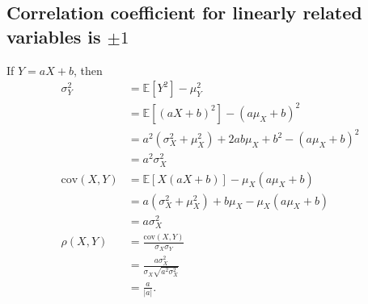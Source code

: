 \documentclass{article}
\begin{document}
\subsection{Correlation coefficient for linearly related variables is $\pm1$}
If $Y=aX+b$, then
\begin{align*}
\sigma_Y^2 &= \mathbb{E}[Y^2] - \mu_Y^2\\
&= \mathbb{E}[(aX+b)^2] - (a\mu_X+b)^2\\
&= a^2(\sigma_X^2+\mu_X^2) + 2ab\mu_X + b^2 - (a\mu_X+b)^2\\
&= a^2\sigma_X^2\\
\mathrm{cov}(X,Y) &= \mathbb{E}[X(aX+b)] - \mu_X(a\mu_X+b)\\
&= a(\sigma_X^2+\mu_X^2) + b\mu_X - \mu_X(a\mu_X+b)\\
&= a\sigma_X^2\\
\rho(X,Y) &= \frac{\mathrm{cov}(X,Y)}{\sigma_X\sigma_Y}\\
&= \frac{a\sigma_X^2}{\sigma_X\sqrt{a^2\sigma_X^2}}\\
&= \frac{a}{|a|}.
\end{align*}



\end{document}
